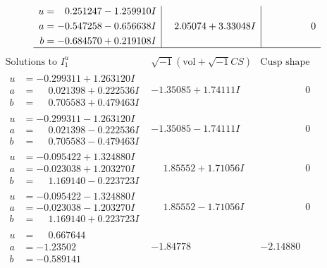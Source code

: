 \documentclass[1p]{elsarticle_modified}
\theoremstyle{definition}
\newcommand{\I}{\sqrt{-1}}
\begin{document}
$$\begin{array}{c|c|c}
\begin{aligned}
u &= \phantom{-}0.251247 - 1.259910 I \\
a &= -0.547258 - 0.656638 I \\
b &= -0.684570 + 0.219108 I\end{aligned}
 & \phantom{-}2.05074 + 3.33048 I & \phantom{-0.000000 } 0\\
 \hline 
 \end{array}$$\newpage$$\begin{array}{c|c|c}  
\text{Solutions to }I^u_{1}& \I (\text{vol} + \sqrt{-1}CS) & \text{Cusp shape}\\
 \hline 
\begin{aligned}
u &= -0.299311 + 1.263120 I \\
a &= \phantom{-}0.021398 + 0.222536 I \\
b &= \phantom{-}0.705583 + 0.479463 I\end{aligned}
 & -1.35085 + 1.74111 I & \phantom{-0.000000 } 0 \\ \hline\begin{aligned}
u &= -0.299311 - 1.263120 I \\
a &= \phantom{-}0.021398 - 0.222536 I \\
b &= \phantom{-}0.705583 - 0.479463 I\end{aligned}
 & -1.35085 - 1.74111 I & \phantom{-0.000000 } 0 \\ \hline\begin{aligned}
u &= -0.095422 + 1.324880 I \\
a &= -0.023038 + 1.203270 I \\
b &= \phantom{-}1.169140 - 0.223723 I\end{aligned}
 & \phantom{-}1.85552 + 1.71056 I & \phantom{-0.000000 } 0 \\ \hline\begin{aligned}
u &= -0.095422 - 1.324880 I \\
a &= -0.023038 - 1.203270 I \\
b &= \phantom{-}1.169140 + 0.223723 I\end{aligned}
 & \phantom{-}1.85552 - 1.71056 I & \phantom{-0.000000 } 0 \\ \hline\begin{aligned}
u &= \phantom{-}0.667644\phantom{ +0.000000I} \\
a &= -1.23502\phantom{ +0.000000I} \\
b &= -0.589141\phantom{ +0.000000I}\end{aligned}
 & -1.84778\phantom{ +0.000000I} & -2.14880\phantom{ +0.000000I} \\ \hline\begin{aligned}

\end{aligned}
\end{array}$$
\end{document}

